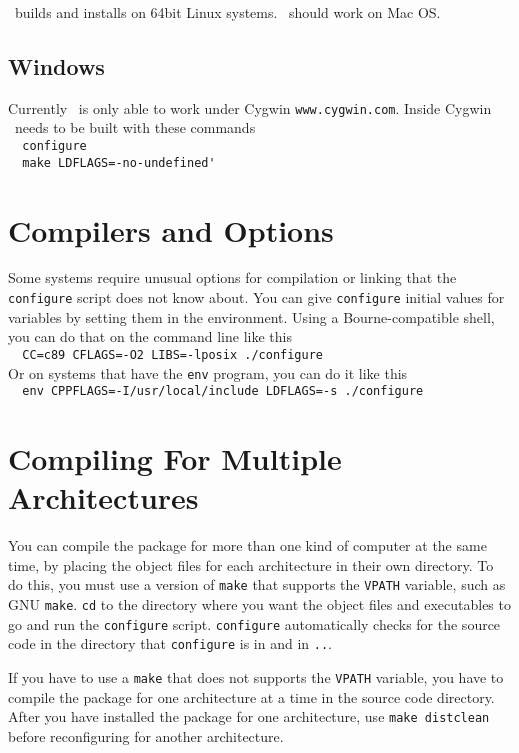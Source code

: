 \GLOBES\ builds and installs on 64bit Linux systems.
\GLOBES\ should work on Mac OS.

\subsection*{Windows}


Currently \GLOBES\ is only able to work under Cygwin \verb+www.cygwin.com+.
Inside Cygwin \GLOBES\ needs to be built with these commands\\
\verb+  configure+\\
\verb+  make LDFLAGS=-no-undefined'+

\section*{Compilers and Options}

   Some systems require unusual options for compilation or linking that
the \verb+configure+ script does not know about.  You can give \verb+configure+
initial values for variables by setting them in the environment.  Using
a Bourne-compatible shell, you can do that on the command line like
this\\
\verb+  CC=c89 CFLAGS=-O2 LIBS=-lposix ./configure+\\

Or on systems that have the \verb+env+ program, you can do it like this\\
\verb+  env CPPFLAGS=-I/usr/local/include LDFLAGS=-s ./configure+

\section*{Compiling For Multiple Architectures}


   You can compile the package for more than one kind of computer at the
same time, by placing the object files for each architecture in their
own directory.  To do this, you must use a version of \verb+make+ that
supports the \verb+VPATH+ variable, such as GNU \verb+make+.  \verb+cd+ to the
directory where you want the object files and executables to go and run
the \verb+configure+ script.  \verb+configure+ automatically checks for the
source code in the directory that \verb+configure+ is in and in \verb+..+.

   If you have to use a \verb+make+ that does not supports the \verb+VPATH+
variable, you have to compile the package for one architecture at a time
in the source code directory.  After you have installed the package for
one architecture, use \verb+make distclean+ before reconfiguring for another
architecture.

